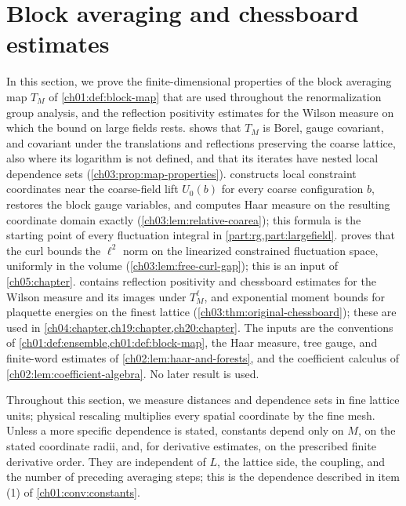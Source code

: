\chapter{Block averaging and chessboard estimates}\label{ch03:chapter}

In this section, we prove the finite-dimensional properties of the block averaging map $T_M$ of \cref{ch01:def:block-map} that are used throughout the renormalization group analysis, and the reflection positivity estimates for the Wilson measure on which the bound on large fields rests.  shows that $T_M$ is Borel, gauge covariant, and covariant under the translations and reflections preserving the coarse lattice, also where its logarithm is not defined, and that its iterates have nested local dependence sets (\cref{ch03:prop:map-properties}).  constructs local constraint coordinates near the coarse-field lift $U_0(b)$ for every coarse configuration $b$, restores the block gauge variables, and computes Haar measure on the resulting coordinate domain exactly (\cref{ch03:lem:relative-coarea}); this formula is the starting point of every fluctuation integral in \cref{part:rg,part:largefield}.  proves that the curl bounds the $\ell^2$ norm on the linearized constrained fluctuation space, uniformly in the volume (\cref{ch03:lem:free-curl-gap}); this is an input of \cref{ch05:chapter}.  contains reflection positivity and chessboard estimates for the Wilson measure and its images under $T_M^\ell$, and exponential moment bounds for plaquette energies on the finest lattice (\cref{ch03:thm:original-chessboard}); these are used in \cref{ch04:chapter,ch19:chapter,ch20:chapter}. The inputs are the conventions of \cref{ch01:def:ensemble,ch01:def:block-map}, the Haar measure, tree gauge, and finite-word estimates of \cref{ch02:lem:haar-and-forests}, and the coefficient calculus of \cref{ch02:lem:coefficient-algebra}. No later result is used.

Throughout this section, we measure distances and dependence sets in fine lattice units; physical rescaling multiplies every spatial coordinate by the fine mesh. Unless a more specific dependence is stated, constants depend only on $M$, on the stated coordinate radii, and, for derivative estimates, on the prescribed finite derivative order. They are independent of $L$, the lattice side, the coupling, and the number of preceding averaging steps; this is the dependence described in item (1) of \cref{ch01:conv:constants}.

